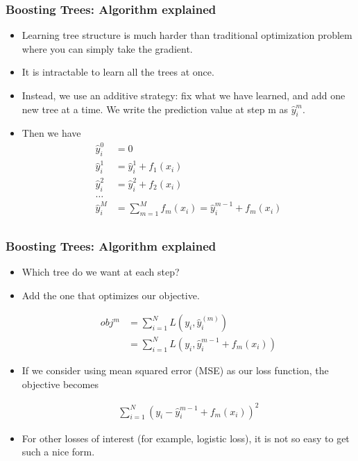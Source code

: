 \documentclass[
  shownotes,
  xcolor={svgnames},
  hyperref={colorlinks,citecolor=DarkBlue,linkcolor=DarkRed,urlcolor=DarkBlue}
  , aspectratio=169]{beamer}
\begin{document}
\begin{frame}[fragile]
\frametitle{Boosting Trees: Algorithm explained}

\begin{itemize}
\item Learning tree structure is much harder than traditional optimization problem where you can simply take the gradient. 
\item It is intractable to learn all the trees at once. 
\item Instead, we use an additive strategy: fix what we have learned, and add one new tree at a time. We write the prediction value at step m as $\hat{y}_i^{m}$. 
\item Then we have
\begin{align}
\hat{y}_i^{0} &=0 \\ \nonumber
\hat{y}_i^{1} &= \hat{y}_i^{1} + f_1(x_i) \\ \nonumber
\hat{y}_i^{2} &= \hat{y}_i^{2} + f_2(x_i) \\ \nonumber
\dots \\ \nonumber
\hat{y}_i^{M} &= \sum_{m=1}^M f_m(x_i) = \hat{y}_i^{m-1} + f_m(x_i) \\ \nonumber
\end{align}
\end{itemize}


 \end{frame}
\begin{frame}[fragile]
\frametitle{Boosting Trees: Algorithm explained}

\begin{itemize}


\item Which tree do we want at each step? 
\item Add the one that optimizes our objective.

\begin{align}
obj^m &= \sum_{i=1}^N L(y_i,\hat{y}_i^{(m)}) \\
     &= \sum_{i=1}^N L(y_i,\hat{y}_i^{m-1} + f_m(x_i))
\end{align}

\item If we consider using mean squared error (MSE) as our loss function, the objective becomes

\begin{align}
\sum_{i=1}^N (y_i-\hat{y}_i^{m-1} + f_m(x_i))^2
\end{align}

\item  For other losses of interest (for example, logistic loss), it is not so easy to get such a nice form.
\end{itemize}
 \end{frame}
\end{document}
